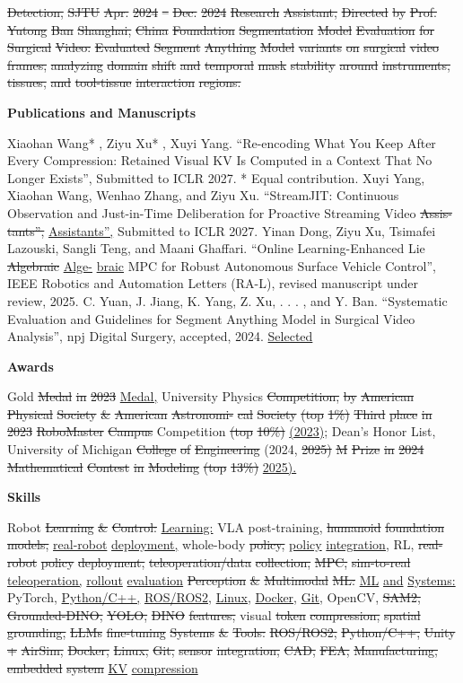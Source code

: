 \documentclass[10pt,letterpaper]{article}
\newcommand{\del}[1]{{\color{red}\sout{#1}}}
\newcommand{\add}[1]{{\color{blue}\uline{#1}}}
\begin{document}
\del{Detection,} \del{SJTU} \del{Apr.} \del{2024} \del{--} \del{Dec.} \del{2024} \del{Research} \del{Assistant,} \del{Directed} \del{by} \del{Prof.} \del{Yutong} \del{Ban} \del{Shanghai,} \del{China} \del{} \del{Foundation} \del{Segmentation} \del{Model} \del{Evaluation} \del{for} \del{Surgical} \del{Video:} \del{Evaluated} \del{Segment} \del{Anything} \del{Model} \del{variants} \del{on} \del{surgical} \del{video} \del{frames,} \del{analyzing} \del{domain} \del{shift} \del{and} \del{temporal} \del{mask} \del{stability} \del{around} \del{instruments,} \del{tissues,} \del{and} \del{tool-tissue} \del{interaction} \del{regions.} \par\medskip\textbf{Publications and Manuscripts}\par   Xiaohan Wang* , Ziyu Xu* , Xuyi Yang. ``Re-encoding What You Keep After Every Compression: Retained Visual KV Is Computed in a Context That No Longer Exists'', Submitted to ICLR 2027. * Equal contribution.  Xuyi Yang, Xiaohan Wang, Wenhao Zhang, and Ziyu Xu. ``StreamJIT: Continuous Observation and Just-in-Time Deliberation for Proactive Streaming Video \del{Assis-} \del{tants'',} \add{Assistants'',} Submitted to ICLR 2027.  Yinan Dong, Ziyu Xu, Tsimafei Lazouski, Sangli Teng, and Maani Ghaffari. ``Online Learning-Enhanced Lie \del{Algebraic} \add{Alge-} \add{braic} MPC for Robust Autonomous Surface Vehicle Control'', IEEE Robotics and Automation Letters (RA-L), revised manuscript under review, 2025.  C. Yuan, J. Jiang, K. Yang, Z. Xu, . . . , and Y. Ban. ``Systematic Evaluation and Guidelines for Segment Anything Model in Surgical Video Analysis'', npj Digital Surgery, accepted, 2024. \add{Selected} \par\medskip\textbf{Awards}\par  \del{} Gold \del{Medal} \del{in} \del{2023} \add{Medal,} University Physics \del{Competition,} \del{by} \del{American} \del{Physical} \del{Society} \del{\&} \del{American} \del{Astronomi-} \del{cal} \del{Society} \del{(top} \del{1\%)} \del{} \del{Third} \del{place} \del{in} \del{2023} \del{RoboMaster} \del{Campus} Competition \del{(top} \del{10\%)} \del{} \add{(2023);} Dean's Honor List, University of Michigan \del{College} \del{of} \del{Engineering} (2024, \del{2025)} \del{} \del{M} \del{Prize} \del{in} \del{2024} \del{Mathematical} \del{Contest} \del{in} \del{Modeling} \del{(top} \del{13\%)} \add{2025).} \par\medskip\textbf{Skills}\par   Robot \del{Learning} \del{\&} \del{Control:} \add{Learning:} VLA post-training, \del{humanoid} \del{foundation} \del{models,} \add{real-robot} \add{deployment,} whole-body \del{policy,} \add{policy} \add{integration,} RL, \del{real-} \del{robot} \del{policy} \del{deployment,} \del{teleoperation/data} \del{collection,} \del{MPC,} \del{sim-to-real} \add{teleoperation,} \add{rollout} \add{evaluation}  \del{Perception} \del{\&} \del{Multimodal} \del{ML:} \add{ML} \add{and} \add{Systems:} PyTorch, \add{Python/C++,} \add{ROS/ROS2,} \add{Linux,} \add{Docker,} \add{Git,} OpenCV, \del{SAM2,} \del{Grounded-DINO,} \del{YOLO,} \del{DINO} \del{features,} visual \del{token} \del{compression,} \del{spatial} \del{grounding,} \del{LLMs} \del{fine-tuning} \del{} \del{Systems} \del{\&} \del{Tools:} \del{ROS/ROS2,} \del{Python/C++,} \del{Unity} \del{+} \del{AirSim,} \del{Docker,} \del{Linux,} \del{Git,} \del{sensor} \del{integration,} \del{CAD,} \del{FEA,} \del{Manufacturing,} \del{embedded} \del{system} \add{KV} \add{compression}\end{document}
\end{document}
